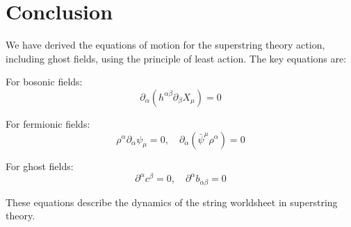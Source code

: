 \documentclass{article}
\begin{document}
\section{Conclusion}

We have derived the equations of motion for the superstring theory action, including ghost fields, using the principle of least action. The key equations are:

For bosonic fields:
\begin{equation}
\partial_\alpha (h^{\alpha\beta} \partial_\beta X_\mu) = 0
\end{equation}

For fermionic fields:
\begin{equation}
\rho^\alpha \partial_\alpha \psi_\mu = 0, \quad \partial_\alpha(\bar{\psi}^\mu \rho^\alpha) = 0
\end{equation}

For ghost fields:
\begin{equation}
\partial^\alpha c^\beta = 0, \quad \partial^\alpha b_{\alpha\beta} = 0
\end{equation}

These equations describe the dynamics of the string worldsheet in superstring theory.
\end{document}
